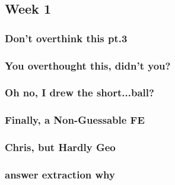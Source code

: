 \documentclass[titlepage=true]{scrartcl}
\begin{document}
{{    
    \subsection{Week 1}

    \subsubsection{Don't overthink this pt.3}
    \label{18-1-1}
    
    \newpage

    \subsubsection{You overthought this, didn't you?}
    \label{18-1-2}
    
    \newpage

    \subsubsection{Oh no, I drew the short...ball?}
    \label{18-1-3}
    
    \newpage

    \subsubsection{Finally, a Non-Guessable FE}
    \label{18-1-4}
    
    \newpage
    
    \subsubsection{Chris, but Hardly Geo}
    \label{18-1-5}
    
    \newpage

    \subsubsection{answer extraction why}
    \label{18-1-6}
    
    \newpage

    

}}
\end{document}
